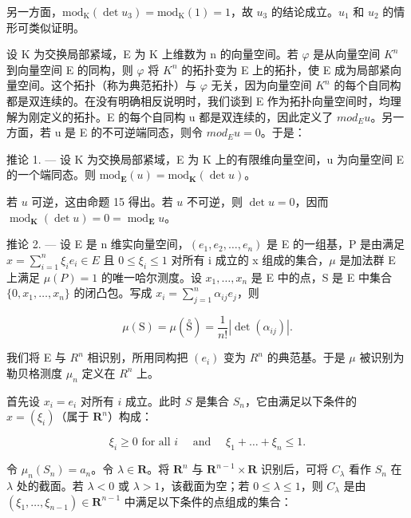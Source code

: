 另一方面，\(\mathrm{mod}_{\mathrm{K}}(\det u_{3})=\mathrm{mod}_{\mathrm{K}}(1)=1\)，故 \(u_{3}\) 的结论成立。\(u_{1}\) 和 \(u_{2}\) 的情形可类似证明。

设 K 为交换局部紧域，E 为 K 上维数为 n 的向量空间。若 \(\varphi\) 是从向量空间 \(K^{n}\) 到向量空间 E 的同构，则 \(\varphi\) 将 \(K^{n}\) 的拓扑变为 E 上的拓扑，使 E 成为局部紧向量空间。这个拓扑（称为典范拓扑）与 \(\varphi\) 无关，因为向量空间 \(K^{n}\) 的每个自同构都是双连续的。在没有明确相反说明时，我们谈到 E 作为拓扑向量空间时，均理解为刚定义的拓扑。E 的每个自同构 u 都是双连续的，因此定义了 \(mod_{E}u\)。另一方面，若 u 是 E 的不可逆端同态，则令 \(mod_{E}u = 0\)。于是：

推论 1. --- 设 K 为交换局部紧域，E 为 K 上的有限维向量空间，u 为向量空间 E 的一个端同态。则 \(\text{mod}_{\mathbf{E}}(u) = \text{mod}_{\mathbf{K}}(\det u)\)。

若 \(u\) 可逆，这由命题 15 得出。若 \(u\) 不可逆，则 \(\det u = 0\)，因而 \(\operatorname{mod}_{\mathbf{K}}(\det u) = 0 = \operatorname{mod}_{\mathbf{E}}u\)。

推论 2. --- 设 E 是 n 维实向量空间，\((e_{1}, e_{2}, \ldots, e_{n})\) 是 E 的一组基，P 是由满足 \(x = \sum_{i=1}^{n} \xi_{i} e_{i} \in E\) 且 \(0 \leqslant \xi_{i} \leqslant 1\) 对所有 i 成立的 x 组成的集合，\(\mu\) 是加法群 E 上满足 \(\mu(P) = 1\) 的唯一哈尔测度。设 \(x_{1}, \ldots, x_{n}\) 是 E 中的点，S 是 E 中集合 \(\{0, x_{1}, \ldots, x_{n}\}\) 的闭凸包。写成 \(x_{i} = \sum_{j=1}^{n} \alpha_{ij} e_{j}\)，则

\[
\mu (\mathrm{S}) = \mu (\stackrel {\circ} {\mathrm{S}}) = \frac {1}{n !} | \det (\alpha_ {i j}) |.
\]

我们将 E 与 \(R^{n}\) 相识别，所用同构把 \((e_{i})\) 变为 \(R^{n}\) 的典范基。于是 \(\mu\) 被识别为勒贝格测度 \(\mu_{n}\) 定义在 \(R^{n}\) 上。

首先设 \(x_{i} = e_{i}\) 对所有 \(i\) 成立。此时 \(S\) 是集合 \(S_{n}\)，它由满足以下条件的 \(x = (\xi_{i})\)（属于 \(\mathbf{R}^n\)）构成：

\[
\xi_ {i} \geqslant 0 \text {   for   all   } i \quad \text { and } \quad \xi_ {1} + \dots + \xi_ {n} \leqslant 1.
\]

令 \(\mu_n(S_n) = a_n\)。令 \(\lambda \in \mathbf{R}\)。将 \(\mathbf{R}^n\) 与 \(\mathbf{R}^{n-1} \times \mathbf{R}\) 识别后，可将 \(C_\lambda\) 看作 \(S_n\) 在 \(\lambda\) 处的截面。若 \(\lambda < 0\) 或 \(\lambda > 1\)，该截面为空；若 \(0 \leqslant \lambda \leqslant 1\)，则 \(C_\lambda\) 是由 \((\xi_1, \ldots, \xi_{n-1}) \in \mathbf{R}^{n-1}\) 中满足以下条件的点组成的集合：

